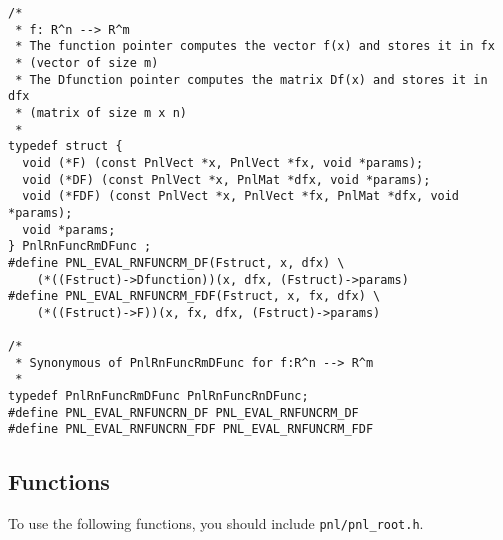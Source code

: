 \begin{verbatim}
/*
 * f: R^n --> R^m
 * The function pointer computes the vector f(x) and stores it in fx
 * (vector of size m)
 * The Dfunction pointer computes the matrix Df(x) and stores it in dfx
 * (matrix of size m x n)
 *
typedef struct {
  void (*F) (const PnlVect *x, PnlVect *fx, void *params);
  void (*DF) (const PnlVect *x, PnlMat *dfx, void *params);
  void (*FDF) (const PnlVect *x, PnlVect *fx, PnlMat *dfx, void *params);
  void *params;
} PnlRnFuncRmDFunc ;
#define PNL_EVAL_RNFUNCRM_DF(Fstruct, x, dfx) \
    (*((Fstruct)->Dfunction))(x, dfx, (Fstruct)->params)
#define PNL_EVAL_RNFUNCRM_FDF(Fstruct, x, fx, dfx) \
    (*((Fstruct)->F))(x, fx, dfx, (Fstruct)->params)

/*
 * Synonymous of PnlRnFuncRmDFunc for f:R^n --> R^m
 *
typedef PnlRnFuncRmDFunc PnlRnFuncRnDFunc;
#define PNL_EVAL_RNFUNCRN_DF PNL_EVAL_RNFUNCRM_DF
#define PNL_EVAL_RNFUNCRN_FDF PNL_EVAL_RNFUNCRM_FDF
\end{verbatim}

\subsection{Functions}

To use the following functions, you should include \verb!pnl/pnl_root.h!.

